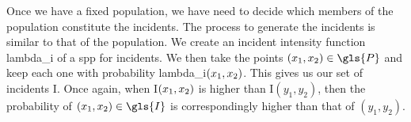 Once we have a fixed population, we have need to decide which members of the population constitute the incidents.
The process to generate the incidents is similar to that of the population.
We create an incident intensity function \gls{lambda_i} of a \gls{spp} for incidents.
We then take the points $\xvec \in \gls{P}$ and keep each one with probability \gls{lambda_i}$(x_1, x_2)$.
This gives us our set of incidents \gls{I}.
Once again, when \gls{I}$(x_1, x_2)$ is higher than \gls{I}$(y_1, y_2)$,
then the probability of $\xvec \in \gls{I}$ is correspondingly higher than that of $(y_1, y_2)$.